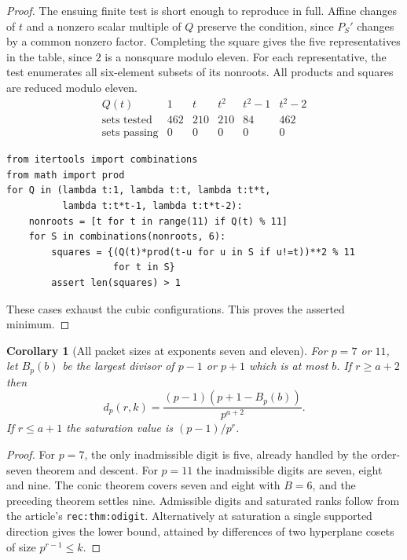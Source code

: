\documentclass[11pt]{article}
\newtheorem{corollary}[theorem]{Corollary}
\begin{document}
\begin{proof}
The ensuing finite test is short enough to reproduce in full. Affine changes of $t$ and a nonzero scalar multiple of $Q$ preserve the condition, since $P_S'$ changes by a common nonzero factor. Completing the square gives the five representatives in the table, since $2$ is a nonsquare modulo eleven. For each representative, the test enumerates all six-element subsets of its nonroots. All products and squares are reduced modulo eleven.
\[
\begin{array}{c|rrrrr}
 Q(t)&1&t&t^2&t^2-1&t^2-2\\\hline
 \text{sets tested}&462&210&210&84&462\\
 \text{sets passing}&0&0&0&0&0
\end{array}
\]
\begin{verbatim}
from itertools import combinations
from math import prod
for Q in (lambda t:1, lambda t:t, lambda t:t*t,
          lambda t:t*t-1, lambda t:t*t-2):
    nonroots = [t for t in range(11) if Q(t) % 11]
    for S in combinations(nonroots, 6):
        squares = {(Q(t)*prod(t-u for u in S if u!=t))**2 % 11
                   for t in S}
        assert len(squares) > 1
\end{verbatim}
These cases exhaust the cubic configurations. This proves the asserted minimum.
\end{proof}

\begin{corollary}[All packet sizes at exponents seven and eleven]
For $p=7$ or $11$, let $B_p(b)$ be the largest divisor of $p-1$ or $p+1$ which is at most $b$. If $r\ge a+2$ then
\[
         d_p(r,k)=\frac{(p-1)(p+1-B_p(b))}{p^{a+2}}.
\]
If $r\le a+1$ the saturation value is $(p-1)/p^r$.
\end{corollary}
\begin{proof}
For $p=7$, the only inadmissible digit is five, already handled by the order-seven theorem and descent. For $p=11$ the inadmissible digits are seven, eight and nine. The conic theorem covers seven and eight with $B=6$, and the preceding theorem settles nine. Admissible digits and saturated ranks follow from the article's \texttt{rec:thm:odigit}. Alternatively at saturation a single supported direction gives the lower bound, attained by differences of two hyperplane cosets of size $p^{r-1}\le k$.
\end{proof}
\end{document}
